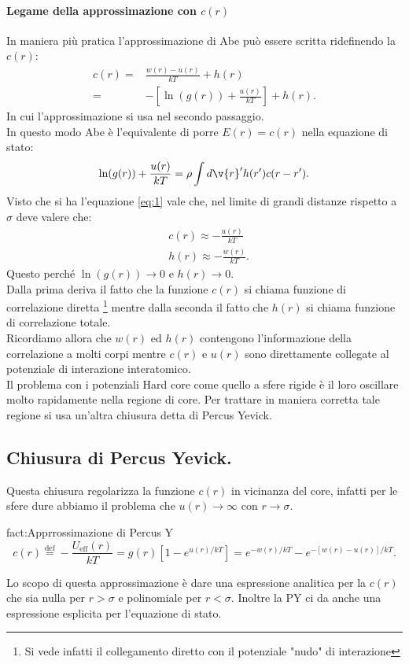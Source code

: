 \paragraph{Legame della approssimazione con $c(r)$}
In maniera più pratica l'approssimazione di Abe può essere scritta ridefinendo la $c(r)$:
 \[\begin{aligned}
	 c(r) 
	 =&
	 \frac{w(r)-u(r)}{kT}+h(r)\\
	 =&
	 - \left[ \ln(g(r)) + \frac{u(r)}{kT} \right] + h(r)
	 \label{eq:1}
.\end{aligned}\]
In cui l'approssimazione si usa nel secondo passaggio.\\
In questo modo Abe è l'equivalente di porre $E(r)=c(r)$ nella equazione di stato:
\[
	\ln(g(r)) + \frac{u(r)}{kT} = \rho \int d\v{r}' h(r')c(r-r')
	\label{eq:2}
.\] 
Visto che si ha l'equazione \ref{eq:1} vale che, nel limite di grandi distanze rispetto a  $\sigma$ deve valere che:
\[\begin{aligned}
	&c(r) \approx -\frac{u(r)}{kT}\\
	&h(r) \approx -\frac{w(r)}{kT}
.\end{aligned}\]
Questo perché $\ln (g(r) ) \to 0$ e $h(r)\to 0$.\\
Dalla prima deriva il fatto che la funzione $c(r)$ si chiama funzione di correlazione diretta \footnote{Si vede infatti il collegamento diretto con il potenziale "nudo" di interazione} mentre dalla seconda il fatto che $h(r)$ si chiama funzione di correlazione totale.\\
Ricordiamo allora che $w(r)$ ed $h(r)$ contengono l'informazione della correlazione a molti corpi mentre $c(r)$ e $u(r)$ sono direttamente collegate al potenziale di interazione interatomico.\\
Il problema con i potenziali Hard core come quello a sfere rigide è il loro oscillare molto rapidamente nella regione di core.
Per trattare in maniera corretta tale regione si usa un'altra chiusura detta di Percus Yevick.
\subsection{Chiusura di Percus Yevick.}
Questa chiusura regolarizza la funzione $c(r)$ in vicinanza del core, infatti per le sfere dure abbiamo il problema che $u(r) \to \infty$ con $r\to \sigma$.
\begin{fact}{fact:Apprrossimazione di Percus Y}
	\[
		c(r) 
		\stackrel{\text{def}}{=} 
		-\frac{U_\text{eff}(r)}{kT}
		=
		g(r)\left[ 1-e^{u(r)/kT} \right] 
		=
		e^{-w(r)/kT}-e^{-\left[ w(r)-u(r) \right]/kT}
	.\] 
\end{fact}
Lo scopo di questa approssimazione è dare una espressione analitica per la $c(r)$ che sia nulla per $r>\sigma$ e polinomiale per $r<\sigma$. Inoltre la PY ci da anche una espressione esplicita per l'equazione di stato.
